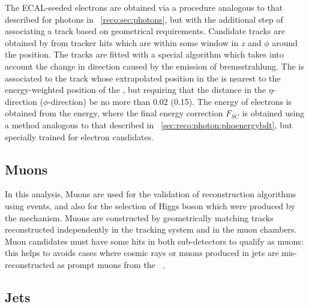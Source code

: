 The ECAL-seeded electrons are obtained via a procedure analogous to that described for photons in \Sec~\ref{reco:sec:photons}, but with the additional step of associating a track based on geometrical requirements. Candidate tracks are obtained by from tracker hits which are within some window in $z$ and $\phi$ around the \SC position. The tracks are fitted with a special algorithm which takes into account the change in direction caused by the emission of bremsstrahlung. The \SC is associated to the track whose extrapolated position in the \ECAL is nearest to the energy-weighted position of the \SC, but requiring that the distance in the $\eta$-direction ($\phi$-direction) be no more than $0.02$ (0.15). The energy of electrons is obtained from the \SC energy, where the final energy correction $F_{SC}$ is obtained using a \BDT method analogous to that described in \Sec~\ref{sec:reco:photon:phoenergybdt}, but specially trained for electron candidates.

\subsection{Muons}

In this analysis, Muons are used for the validation of reconstruction algorithms using \Zmmg events, and also for the selection of Higgs boson which were produced by the \VH mechanism. Muons are constructed by geometrically matching tracks reconstructed independently in the tracking system and in the muon chambers. Muon candidates must have some hits in both sub-detectors to qualify as \PF muons: this helps to avoids cases where cosmic rays or muons produced in jets are mis-reconstructed as prompt muons from the \PV~\cite{MuonReco}.  

\subsection{Jets}

